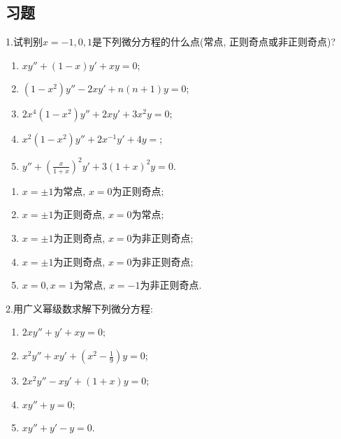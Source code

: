 \subsection{习题}


1.试判别$x=-1,0,1$是下列微分方程的什么点(常点, 正则奇点或非正则奇点)?
\begin{enumerate}[(1)]
\item $xy''+(1-x)y'+xy=0$;
\item $(1-x^2)y''-2xy'+n(n+1)y=0$;
\item $2x^4(1-x^2)y''+2xy'+3x^2y=0$;
\item $x^2(1-x^2)y''+2x^{-1}y'+4y=$;
\item $\displaystyle y''+\left(\frac{x}{1+x}\right)^2y'+3(1+x)^2y=0$.
\end{enumerate}

\begin{solve}
      \begin{enumerate}[(1)]
            \item $x=\pm1$为常点, $x=0$为正则奇点;
            \item $x=\pm1$为正则奇点, $x=0$为常点;
            \item $x=\pm1$为正则奇点, $x=0$为非正则奇点;
            \item $x=\pm1$为正则奇点, $x=0$为非正则奇点;
            \item $x=0,x=1$为常点, $x=-1$为非正则奇点.
      \end{enumerate}
\end{solve}


2.用广义幂级数求解下列微分方程:
\begin{enumerate}[(1)]
\item $2xy''+y'+xy=0$;
\item $x^2y''+xy'+\left(x^2-\frac{1}{9}\right)y=0$;
\item $2x^2y''-xy'+(1+x)y=0$;
\item $xy''+y=0$;
\item $xy''+y'-y=0$.
\end{enumerate}


